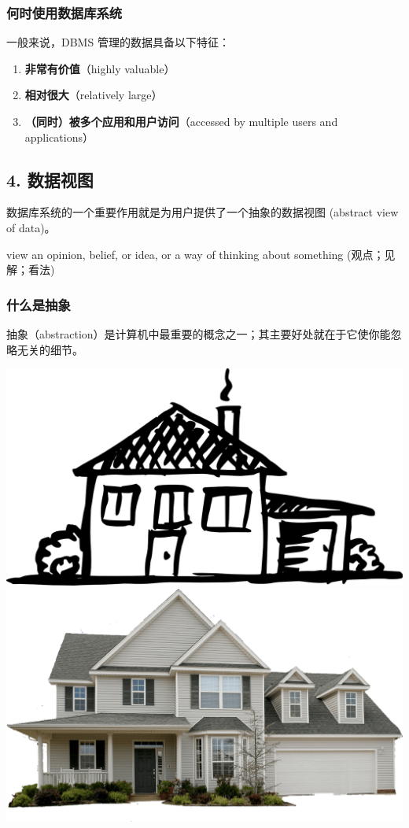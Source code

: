 \documentclass[aspectratio=169, 14pt]{beamer}
\begin{document}
\begin{frame}
    \frametitle{何时使用数据库系统}

一般来说，DBMS 管理的数据具备以下特征：

\begin{enumerate}
    \item \textbf{非常有价值}（highly valuable）
    \item \textbf{相对很大}（relatively large）
    \item \textbf{（同时）被多个应用和用户访问}（accessed by multiple users and applications）
\end{enumerate}
    

\end{frame}

\begin{frame}
    \section{\textcolor{darkmidnightblue}{4. 数据视图}} 
    数据库系统的一个重要作用就是为用户提供了一个\alert{抽象的数据视图} (abstract view of data)。

    \pause
    \begin{block}{view}
        an opinion, belief, or idea, or a way of thinking about something (观点；见解；看法)
    \end{block}
\end{frame}
\begin{frame}
    \frametitle{什么是抽象}    
抽象（abstraction）是计算机中最重要的概念之一；其主要好处就在于它使你能忽略无关的细节。

\includegraphics[width=.45\textwidth]{image/house.png}
\includegraphics[width=.45\textwidth]{image/home.png}
\end{frame}
\end{document}

